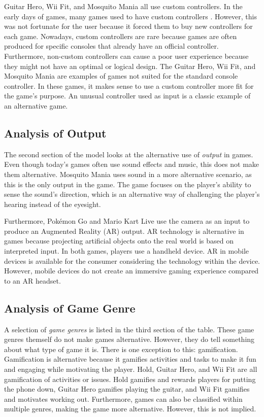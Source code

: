 \documentclass[../Main.tex]{subfiles}
\begin{document}
Guitar Hero, Wii Fit, and Mosquito Mania all use custom controllers. In the early days of games, many games used to have custom controllers \citep{overmars_brief_2012}. However, this was not fortunate for the user because it forced them to buy new controllers for each game. Nowadays, custom controllers are rare because games are often produced for specific consoles that already have an official controller. Furthermore, non-custom controllers can cause a poor user experience because they might not have an optimal or logical design. The Guitar Hero, Wii Fit, and Mosquito Mania are examples of games not suited for the standard console controller. In these games, it makes sense to use a custom controller more fit for the game's purpose. An unusual controller used as input is a classic example of an alternative game.


\subsection{Analysis of Output}
The second section of the model looks at the alternative use of \textit{output} in games. Even though today’s games often use sound effects and music, this does not make them alternative. Mosquito Mania uses sound in a more alternative scenario, as this is the only output in the game. The game focuses on the player's ability to sense the sound's direction, which is an alternative way of challenging the player's hearing instead of the eyesight.

Furthermore, Pokémon Go and Mario Kart Live use the camera as an input to produce an Augmented Reality (AR) output. AR technology is alternative in games because projecting artificial objects onto the real world is based on interpreted input. In both games, players use a handheld device. AR in mobile devices is available for the consumer considering the technology within the device. However, mobile devices do not create an immersive gaming experience compared to an AR headset.


\subsection{Analysis of Game Genre}
A selection of \textit{game genres} is listed in the third section of the table. These game genres themself do not make games alternative. However, they do tell something about what type of game it is. There is one exception to this: gamification. Gamification is alternative because it gamifies activities and tasks to make it fun and engaging while motivating the player. Hold, Guitar Hero, and Wii Fit are all gamification of activities or issues. Hold gamifies and rewards players for putting the phone down, Guitar Hero gamifies playing the guitar, and Wii Fit gamifies and motivates working out. Furthermore, games can also be classified within multiple genres, making the game more alternative. However, this is not implied.
\end{document}

